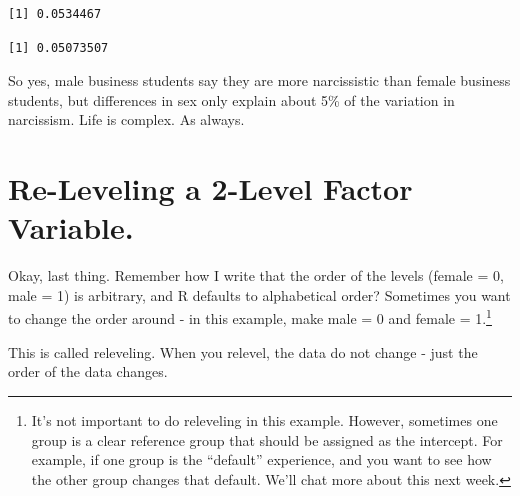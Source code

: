 \documentclass[
  letterpaper,
  DIV=11,
  numbers=noendperiod,
  oneside]{scrreprt}
\newenvironment{Shaded}{\begin{snugshade}}{\end{snugshade}}
\newcommand{\AttributeTok}[1]{\textcolor[rgb]{0.40,0.45,0.13}{#1}}
\newcommand{\CommentTok}[1]{\textcolor[rgb]{0.37,0.37,0.37}{#1}}
\newcommand{\FunctionTok}[1]{\textcolor[rgb]{0.28,0.35,0.67}{#1}}
\newcommand{\NormalTok}[1]{\textcolor[rgb]{0.00,0.23,0.31}{#1}}
\newcommand{\SpecialCharTok}[1]{\textcolor[rgb]{0.37,0.37,0.37}{#1}}
\newcommand{\StringTok}[1]{\textcolor[rgb]{0.13,0.47,0.30}{#1}}
\begin{document}
\begin{verbatim}
[1] 0.0534467
\end{verbatim}

\begin{Shaded}
\end{Shaded}

\begin{verbatim}
[1] 0.05073507
\end{verbatim}

So yes, male business students say they are more narcissistic than
female business students, but differences in sex only explain about 5\%
of the variation in narcissism. Life is complex. As always.

\section{Re-Leveling a 2-Level Factor
Variable.}\label{re-leveling-a-2-level-factor-variable.}

Okay, last thing. Remember how I write that the order of the levels
(female = 0, male = 1) is arbitrary, and R defaults to alphabetical
order? Sometimes you want to change the order around - in this example,
make male = 0 and female = 1.\footnote{It's not important to do
  releveling in this example. However, sometimes one group is a clear
  reference group that should be assigned as the intercept. For example,
  if one group is the ``default'' experience, and you want to see how
  the other group changes that default. We'll chat more about this next
  week.}

This is called releveling. When you relevel, the data do not change -
just the order of the data changes.

\begin{Shaded}
\end{Shaded}
\end{document}
